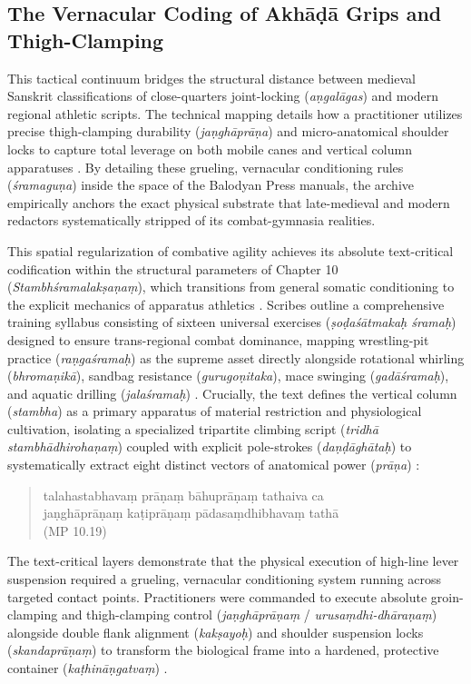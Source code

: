 \documentclass[11pt,twoside,letterpaper]{article}
\begin{document}
\subsection{The Vernacular Coding of Akhāḍā Grips and Thigh-Clamping}
This tactical continuum bridges the structural distance between medieval Sanskrit classifications of close-quarters joint-locking (\textit{aṇgalāgas}) and modern regional athletic scripts. The technical mapping details how a practitioner utilizes precise thigh-clamping durability (\textit{jaṇghāprāṇa}) and micro-anatomical shoulder locks to capture total leverage on both mobile canes and vertical column apparatuses \citep{Khasgivale1929}. By detailing these grueling, vernacular conditioning rules (\textit{śramaguṇa}) inside the space of the Balodyan Press manuals, the archive empirically anchors the exact physical substrate that late-medieval and modern redactors systematically stripped of its combat-gymnasia realities.

This spatial regularization of combative agility achieves its absolute text-critical codification within the structural parameters of Chapter 10 (\textit{Stambhśramalakṣaṇaṃ}), which transitions from general somatic conditioning to the explicit mechanics of apparatus athletics \citep{MP_7}. Scribes outline a comprehensive training syllabus consisting of sixteen universal exercises (\textit{ṣoḍaśātmakaḥ śramaḥ}) designed to ensure trans-regional combat dominance, mapping wrestling-pit practice (\textit{raṇgaśramaḥ}) as the supreme asset directly alongside rotational whirling (\textit{bhromaṇikā}), sandbag resistance (\textit{gurugoṇitaka}), mace swinging (\textit{gadāśramaḥ}), and aquatic drilling (\textit{jalaśramaḥ}) \citep{MP_7}. Crucially, the text defines the vertical column (\textit{stambha}) as a primary apparatus of material restriction and physiological cultivation, isolating a specialized tripartite climbing script (\textit{tridhā stambhādhirohaṇaṃ}) coupled with explicit pole-strokes (\textit{daṇḍāghātaḥ}) to systematically extract eight distinct vectors of anatomical power (\textit{prāṇa}) \citep{MP_7}:

\begin{quote}
talahastabhavaṃ prāṇaṃ bāhuprāṇaṃ tathaiva ca \\
jaṇghāprāṇaṃ kaṭiprāṇaṃ pādasaṃdhibhavaṃ tathā \\ (MP 10.19)
\end{quote}

The text-critical layers demonstrate that the physical execution of high-line lever suspension required a grueling, vernacular conditioning system running across targeted contact points. Practitioners were commanded to execute absolute groin-clamping and thigh-clamping control (\textit{jaṇghāprāṇaṃ} / \textit{urusaṃdhi-dhāraṇaṃ}) alongside double flank alignment (\textit{kakṣayoḥ}) and shoulder suspension locks (\textit{skandaprāṇaṃ}) to transform the biological frame into a hardened, protective container (\textit{kaṭhināṇgatvaṃ}) \citep{MP_7}. 
\end{document}

